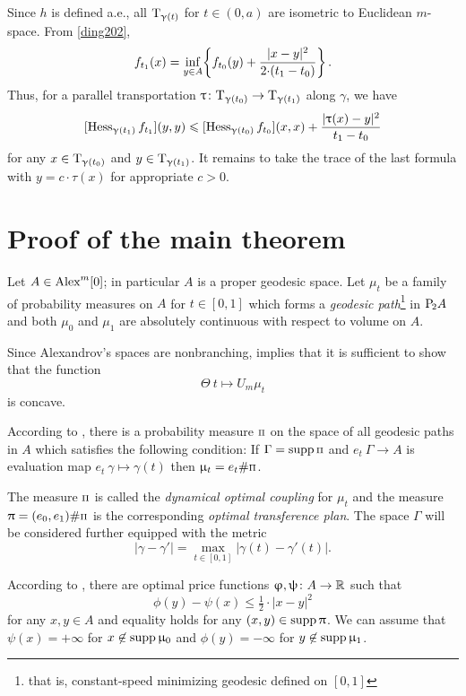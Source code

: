 \documentclass[oneside,a4paper]{article}
\begin{document}
Since $h$ is defined a.e., all $\text{\rm T}_{\upgamma(t)}$ for $t\in(0,a)$ are isometric to Euclidean $m$-space.
From \ref{ding202},
$$f_{t_1}(x)=\inf_{y\in A}\!\left\{f_{t_0}(y)+\frac{|x-y|^2}{2{\cdot}(t_1-t_0)}\right\}.$$
Thus, for a parallel transportation $\uptau\colon\text{\rm T}_{\upgamma(t_0)}\to \text{\rm T}_{\upgamma(t_1)}$ along $\gamma$,
we have 
$$[\operatorname{Hess}_{\upgamma(t_1)}f_{t_1}](y,y)
\leqslant
[\operatorname{Hess}_{\upgamma(t_0)}f_{t_0}](x,x)
+\frac{|\uptau (x)-y|^2}{t_1-t_0}$$
for any $x\in\text{\rm T}_{\upgamma(t_0)}$ and $y\in\text{\rm T}_{\upgamma(t_1)}$.
It remains to take the trace of the last formula with $y=c{\cdot}\tau(x)$ for appropriate $c>0$.
\qeds















\section{Proof of the main theorem}

Let $A\in\CBB m 0$; in particular $A$ is a proper geodesic space.
Let $\mu_t$ be a family of probability measures on $A$ for $t\in[0,1]$ which forms a \emph{geodesic path}\footnote{that is, constant-speed minimizing geodesic defined on $[0,1]$} in $\mathrm {P}_{\!2} A$ and both $\mu_0$ and $\mu_1$ are absolutely continuous with respect to volume on $A$.

Since Alexandrov's spaces are nonbranching,
\cite[30.32]{villani} implies that
it is sufficient to show that the function 
$$\Theta\:t\mapsto U_m\mu_t$$ 
is concave.

\def\Pii{\text{\scriptsize $\Pi$}}

According to \cite[7.22]{villani}, there is a probability measure $\Pii$ on the space of all geodesic paths in $A$ which satisfies the following condition:
If $\Gamma=\supp\Pii$ and $e_t\:\Gamma\to A$ is evaluation map  
$e_t\:\gamma\mapsto\gamma(t)$ then $\mu_t=e_t\#\Pii$.

The measure $\Pii$ is called the  \emph{dynamical optimal coupling} for $\mu_t$ and the measure $\pi=(e_0,e_1)\#\Pii$ is the corresponding \emph{optimal transference plan}.
The space $\Gamma$ will be considered further equipped with the metric
\[|\gamma-\gamma'|=\max_{t\in[0,1]}|\gamma(t)-\gamma'(t)|.\]

According to \cite[5.10]{villani}, there are optimal price functions
 $\upvarphi,\uppsi\colon A\to\mathbb{R}$ such that
$$\phi(y)-\psi(x)\le\tfrac12{\cdot}|x-y|^2$$
for any $x,y\in A$ 
and equality holds for any $(x,y)\in\mathop{\rm supp}\nolimits\uppi$.
We can assume that $\psi(x)=+\infty$ for $x\not\in\mathop{\rm supp}\nolimits\upmu_0$ and $\phi(y)=-\infty$ for $y\not\in\mathop{\rm supp}\nolimits\upmu_1$.
\end{document}
